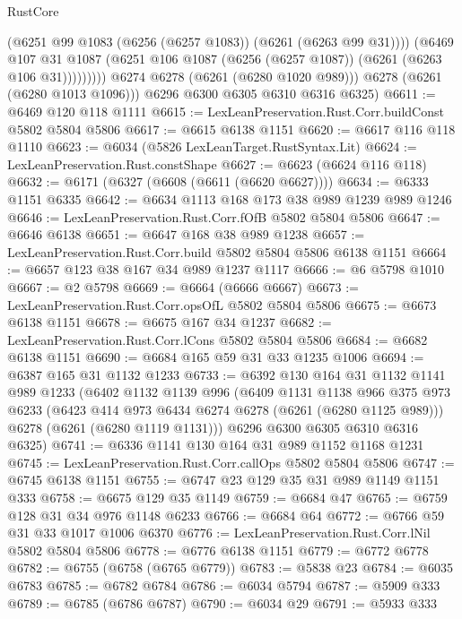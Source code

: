 \begin{lexlean}{RustCore}
\begin{coremodule}
                      (@6251 @99 @1083 (@6256 (@6257 @1083)) (@6261 (@6263 @99 @31))))
                    (@6469
                      @107
                      @31
                      @1087
                      (@6251 @106 @1087 (@6256 (@6257 @1087)) (@6261 (@6263 @106 @31)))))))))
          @6274
          @6278
          (@6261 (@6280 @1020 @989)))
        @6278
        (@6261 (@6280 @1013 @1096)))
      @6296
      @6300
      @6305
      @6310
      @6316
      @6325)
@6611 := @6469 @120 @118 @1111
@6615 := LexLeanPreservation.Rust.Corr.buildConst @5802 @5804 @5806
@6617 := @6615 @6138 @1151
@6620 := @6617 @116 @118 @1110
@6623 := @6034 (@5826 LexLeanTarget.RustSyntax.Lit)
@6624 := LexLeanPreservation.Rust.constShape
@6627 := @6623 (@6624 @116 @118)
@6632 := @6171 (@6327 (@6608 (@6611 (@6620 @6627))))
@6634 := @6333 @1151 @6335
@6642 := @6634 @1113 @168 @173 @38 @989 @1239 @989 @1246
@6646 := LexLeanPreservation.Rust.Corr.fOfB @5802 @5804 @5806
@6647 := @6646 @6138
@6651 := @6647 @168 @38 @989 @1238
@6657 := LexLeanPreservation.Rust.Corr.build @5802 @5804 @5806 @6138 @1151
@6664 := @6657 @123 @38 @167 @34 @989 @1237 @1117
@6666 := @6 @5798 @1010
@6667 := @2 @5798
@6669 := @6664 (@6666 @6667)
@6673 := LexLeanPreservation.Rust.Corr.opsOfL @5802 @5804 @5806
@6675 := @6673 @6138 @1151
@6678 := @6675 @167 @34 @1237
@6682 := LexLeanPreservation.Rust.Corr.lCons @5802 @5804 @5806
@6684 := @6682 @6138 @1151
@6690 := @6684 @165 @59 @31 @33 @1235 @1006
@6694 := @6387 @165 @31 @1132 @1233
@6733 := @6392
    @130
    @164
    @31
    @1132
    @1141
    @989
    @1233
    (@6402
      @1132
      @1139
      @996
      (@6409
        @1131
        @1138
        @966
        @375
        @973
        @6233
        (@6423 @414 @973 @6434 @6274 @6278 (@6261 (@6280 @1125 @989)))
        @6278
        (@6261 (@6280 @1119 @1131)))
      @6296
      @6300
      @6305
      @6310
      @6316
      @6325)
@6741 := @6336 @1141 @130 @164 @31 @989 @1152 @1168 @1231
@6745 := LexLeanPreservation.Rust.Corr.callOps @5802 @5804 @5806
@6747 := @6745 @6138 @1151
@6755 := @6747 @23 @129 @35 @31 @989 @1149 @1151 @333
@6758 := @6675 @129 @35 @1149
@6759 := @6684 @47
@6765 := @6759 @128 @31 @34 @976 @1148 @6233
@6766 := @6684 @64
@6772 := @6766 @59 @31 @33 @1017 @1006 @6370
@6776 := LexLeanPreservation.Rust.Corr.lNil @5802 @5804 @5806
@6778 := @6776 @6138 @1151
@6779 := @6772 @6778
@6782 := @6755 (@6758 (@6765 @6779))
@6783 := @5838 @23
@6784 := @6035 @6783
@6785 := @6782 @6784
@6786 := @6034 @5794
@6787 := @5909 @333
@6789 := @6785 (@6786 @6787)
@6790 := @6034 @29
@6791 := @5933 @333

\end{coremodule}
\end{lexlean}
